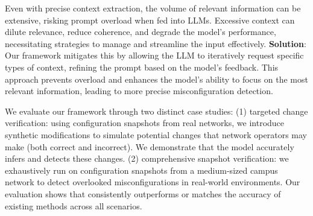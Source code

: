 Even with precise context extraction, the volume of relevant information can be extensive, risking prompt overload when fed into LLMs. Excessive context can dilute relevance, reduce coherence, and degrade the model’s performance, necessitating strategies to manage and streamline the input effectively. \textbf{Solution}: Our framework mitigates this by allowing the LLM to iteratively request specific types of context, refining the prompt based on the model’s feedback. This approach prevents overload and enhances the model’s ability to focus on the most relevant information, leading to more precise misconfiguration detection.


We evaluate our framework through two distinct case studies: (1) targeted change verification: using configuration snapshots from real networks, we introduce synthetic modifications to simulate potential changes that network operators may make (both correct and incorrect). We demonstrate that the model accurately infers and detects these changes. (2) comprehensive snapshot verification: we exhaustively run \sysname{} on configuration snapshots from a medium-sized campus network to detect overlooked misconfigurations in real-world environments. Our evaluation shows that \sysname{} consistently outperforms or matches the accuracy of existing methods across all scenarios.

